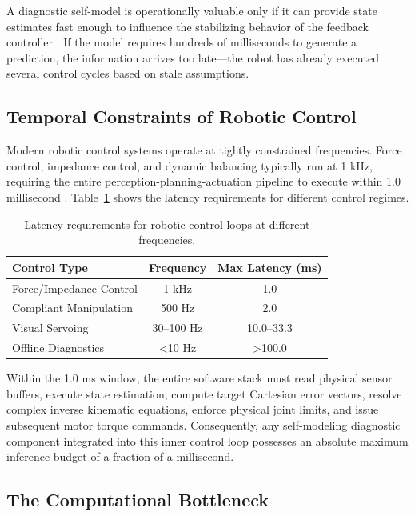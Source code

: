\documentclass[12pt,a4paper,oneside]{report}
\begin{document}
A diagnostic self-model is operationally valuable only if it can provide state estimates fast enough to influence the stabilizing behavior of the feedback controller \cite{hu2024teaching, hu2025learning}. If the model requires hundreds of milliseconds to generate a prediction, the information arrives too late—the robot has already executed several control cycles based on stale assumptions.

\subsection{Temporal Constraints of Robotic Control}
\label{subsec:temporal_constraints}

Modern robotic control systems operate at tightly constrained frequencies. Force control, impedance control, and dynamic balancing typically run at 1 kHz, requiring the entire perception-planning-actuation pipeline to execute within 1.0 millisecond \cite{siciliano2009robotics}. Table~\ref{tab:control_loop_latency} shows the latency requirements for different control regimes.

\begin{table}[H]
\centering
\caption{Latency requirements for robotic control loops at different frequencies.}
\label{tab:control_loop_latency}
\begin{tabular}{lcc}
\toprule
\textbf{Control Type} & \textbf{Frequency} & \textbf{Max Latency (ms)} \\
\midrule
Force/Impedance Control & 1 kHz & 1.0 \\
Compliant Manipulation & 500 Hz & 2.0 \\
Visual Servoing & 30–100 Hz & 10.0–33.3 \\
Offline Diagnostics & <10 Hz & >100.0 \\
\bottomrule
\end{tabular}
\end{table}

Within the 1.0 ms window, the entire software stack must read physical sensor buffers, execute state estimation, compute target Cartesian error vectors, resolve complex inverse kinematic equations, enforce physical joint limits, and issue subsequent motor torque commands. Consequently, any self-modeling diagnostic component integrated into this inner control loop possesses an absolute maximum inference budget of a fraction of a millisecond.

\subsection{The Computational Bottleneck}
\label{subsec:computational_bottleneck}
\end{document}
